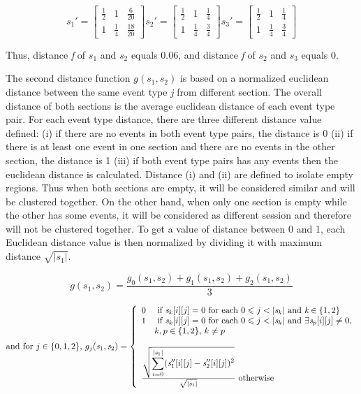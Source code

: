 \[
s_1' = \begin{bmatrix}
  \frac{1}{2} & 1 & \frac{6}{20}\\ 
  1 & \frac{1}{4} & \frac{18}{20}
\end{bmatrix}
s_2' = \begin{bmatrix}
  \frac{1}{2} & 1 & \frac{1}{4}\\
  1 & \frac{1}{4} & \frac{3}{4} 
\end{bmatrix}
s_3' = \begin{bmatrix}
  \frac{1}{2} & 1 & \frac{1}{4}\\
  1 & \frac{1}{4} & \frac{3}{4} 
\end{bmatrix}
\]

Thus, distance \textit{f} of $s_1$ and $s_2$ equals 0.06, and distance \textit{f} of $s_2$ and $s_3$ equals 0.

The second distance function $\textit{g}(\textit{s}_1,\textit{s}_2)$ is based on a normalized euclidean distance between the same event type \textit{j} from different section. The overall distance of both sections is the average euclidean distance of each event type pair. For each event type distance, there are three different distance value defined: (i) if there are no events in both event type pairs, the distance is 0 (ii) if there is at least one event in one section and there are no events in the other section, the distance is 1 (iii) if both event type pairs has any events then the euclidean distance is calculated. Distance (i) and (ii) are defined to isolate empty regions. Thus when both sections are empty, it will be considered similar and will be clustered together. On the other hand, when only one section is empty while the other has some events, it will be considered as different session and therefore will not be clustered together. To get a value of distance between 0 and 1, each Euclidean distance value is then normalized by dividing it with maximum distance $\sqrt{\lvert\textit{s}_1\rvert}$.

$$\textit{g}(\textit{s}_1,\textit{s}_2) = \frac{\textit{g}_0(\textit{s}_1,\textit{s}_2) + \textit{g}_1(\textit{s}_1,\textit{s}_2) + \textit{g}_2(\textit{s}_1,\textit{s}_2)}{3}$$

\[\text{and for } j  \in \{0,1,2\}\text{, } g_j(\textit{s}_1,\textit{s}_2) = \left\{
  \begin{array}{ll}
    0 & \text{ if } \textit{s}_k\lbrack i \rbrack\lbrack j \rbrack=0 \text{ for each } 0 \leqslant j < |\textit{s}_k|\text{ and } \textit{k} \in \{1,2\}\\
    1 & \text{ if } \textit{s}_k\lbrack i \rbrack\lbrack j \rbrack=0 \text{ for each } 0 \leqslant j < |\textit{s}_k| \text{ and } \exists \textit{s}_p\lbrack i \rbrack\lbrack j \rbrack \neq 0,\\
      & k,p \in \{1,2\} \text{, } k \neq p\\
      & \\
	\multicolumn{2}{l}{\frac{\sqrt{\displaystyle\sum_{i=0}^{\lvert\textit{s}_1\lvert} (\textit{s}_1''\lbrack i \rbrack\lbrack j \rbrack - \textit{s}_2''\lbrack i \rbrack\lbrack j \rbrack)^2}}{\sqrt{\lvert\textit{s}_1\rvert}} \text{ otherwise}} 
  \end{array}
\right.
\]

